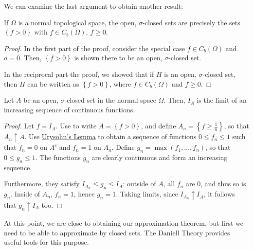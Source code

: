 We can examine the last argument to obtain another result:

\begin{corl}\label{corollary:Baire sets and functions}
		If \(\Omega\) is a normal topological space, the open, \(\sigma\)-closed sets are precisely the sets \(\left\{f>0\right\}\) with \(f\in C_b(\Omega)\), \(f\geq 0\).
\end{corl}
\begin{proof}
		In the first part of the proof, consider the special case \(f\in C_b(\Omega)\) and \(a=0\). Then, \(\left\{f>0\right\}\) is shown there to be an open, \(\sigma\)-closed set.

		In the reciprocal part the proof, we showed that if \(H\) is an open, \(\sigma\)-closed set, then \(H\) can be written as \(\left\{f>0\right\}\), where \(f\in C_b(\Omega)\) and \(f\geq 0\).
\end{proof}
\begin{lemm}
		Let \(A\) be an open, \(\sigma\)-closed set in the normal space \(\Omega\). Then, \(I_A\) is the limit of an increasing sequence of continuous functions.
\end{lemm}
\begin{proof}
		Let \(f=I_A\). Use  to write \(A=\left\{f>0\right\}\), and define \(A_n=\left\{f\geq\frac{1}{n}\right\}\), so that \(A_n\uparrow A\). Use \hyperref[Urysohn]{Urysohn's Lemma} to obtain a sequence of functions \(0\leq f_n\leq 1\) such that \(f_n=0\) on \(A^c\) and \(f_n=1\) on \(A_n\). Define \(g_n=\max(f_1,\dots,f_n)\), so that \(0\leq g_n\leq 1\). The functions \(g_n\) are clearly continuous and form an increasing sequence.

		Furthermore, they satisfy \(I_{A_n}\leq g_n\leq I_A\): outside of \(A\), all \(f_n\) are \(0\), and thus so is \(g_n\). Inside of \(A_n\), \(f_n=1\), hence  \(g_n=1\). Taking limits, since  \(I_{A_n}\uparrow I_A\), it follows that \(g_n\uparrow I_A\) too.
\end{proof}

At this point, we are close to obtaining our approximation theorem, but first we need to be able to approximate by closed sets. The Daniell Theory provides useful tools for this purpose.

